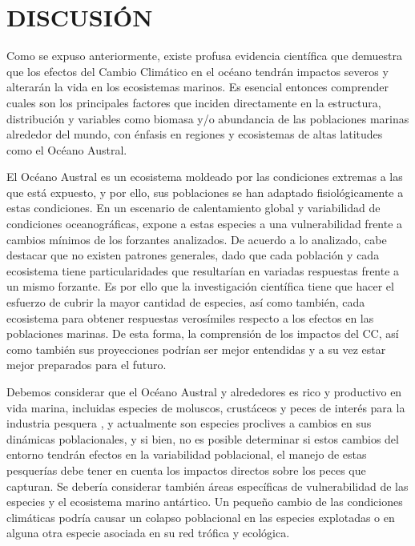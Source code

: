 \documentclass{sydneythesis}
\begin{document}
\pagebreak

\hypertarget{discusiuxf3n}{%
\section{DISCUSIÓN}\label{discusiuxf3n}}

Como se expuso anteriormente, existe profusa evidencia científica que demuestra que los efectos del Cambio Climático en el océano tendrán impactos severos y alterarán la vida en los ecosistemas marinos. Es esencial entonces comprender cuales son los principales factores que inciden directamente en la estructura, distribución y variables como biomasa y/o abundancia de las poblaciones marinas alrededor del mundo, con énfasis en regiones y ecosistemas de altas latitudes como el Océano Austral.

El Océano Austral es un ecosistema moldeado por las condiciones extremas a las que está expuesto, y por ello, sus poblaciones se han adaptado fisiológicamente a estas condiciones. En un escenario de calentamiento global y variabilidad de condiciones oceanográficas, expone a estas especies a una vulnerabilidad frente a cambios mínimos de los forzantes analizados. De acuerdo a lo analizado, cabe destacar que no existen patrones generales, dado que cada población y cada ecosistema tiene particularidades que resultarían en variadas respuestas frente a un mismo forzante. Es por ello que la investigación científica tiene que hacer el esfuerzo de cubrir la mayor cantidad de especies, así como también, cada ecosistema para obtener respuestas verosímiles respecto a los efectos en las poblaciones marinas. De esta forma, la comprensión de los impactos del CC, así como también sus proyecciones podrían ser mejor entendidas y a su vez estar mejor preparados para el futuro.

Debemos considerar que el Océano Austral y alrededores es rico y productivo en vida marina, incluidas especies de moluscos, crustáceos y peces de interés para la industria pesquera \autocite{Arana2020b}, y actualmente son especies proclives a cambios en sus dinámicas poblacionales, y si bien, no es posible determinar si estos cambios del entorno tendrán efectos en la variabilidad poblacional, el manejo de estas pesquerías debe tener en cuenta los impactos directos sobre los peces que capturan. Se debería considerar también áreas específicas de vulnerabilidad de las especies y el ecosistema marino antártico. Un pequeño cambio de las condiciones climáticas podría causar un colapso poblacional en las especies explotadas o en alguna otra especie asociada en su red trófica y ecológica.
\end{document}
